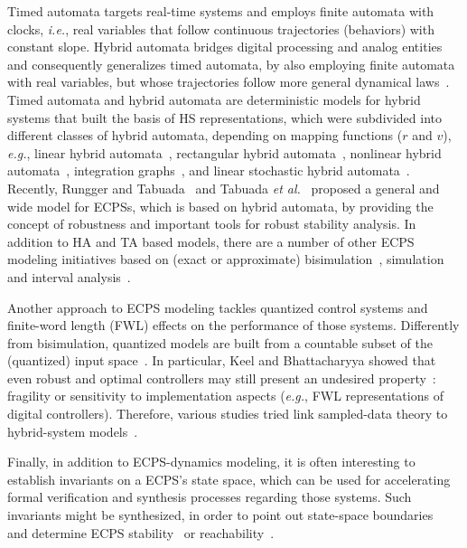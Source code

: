 \documentclass[format=acmsmall, review=false, screen=true]{acmart}
\begin{document}
Timed automata targets real-time systems and employs finite automata with clocks, {\it i.e.}, real variables that follow continuous trajectories (behaviors) with constant slope. Hybrid automata bridges digital processing and analog entities and consequently generalizes timed automata, by also employing finite automata with real variables, but whose trajectories follow more general dynamical laws~\cite{Henzinger95}.  Timed automata and hybrid automata are deterministic models for hybrid systems that built the basis of HS representations, which were subdivided into different classes of hybrid automata, depending on mapping functions ($r$ and $v$), {\it e.g.}, linear hybrid automata~\cite{Lafferriere99}, rectangular hybrid automata~\cite{Puri94,Henzinger95}, nonlinear hybrid automata~\cite{Henzinger95NL,Broucke1997}, integration graphs~\cite{Kesten1993}, and linear stochastic hybrid automata~\cite{Julius09}. Recently, Rungger and Tabuada~\cite{Rungger16} and Tabuada {\it et al.}~\cite{Tabuada14} proposed a general and wide model for ECPSs, which is based on hybrid automata, by providing the concept of robustness and important tools for robust stability analysis. In addition to HA and TA based models, there are a number of other ECPS modeling initiatives based on (exact or approximate) bisimulation~\cite{Girard11}, simulation~\cite{Rungger13} and interval analysis~\cite{Li16}.



Another approach to ECPS modeling tackles quantized control systems and finite-word length (FWL) effects on the performance of those systems. Differently from bisimulation, quantized models are built from a countable subset of the (quantized) input space~\cite{Tabuada07}. In particular, Keel and Bhattacharyya showed that even robust and optimal controllers may still present an undesired property~\cite{Keel01,bhattacharyya}: fragility or sensitivity to implementation aspects ({\it e.g.}, FWL representations of digital controllers). Therefore, various studies tried link sampled-data theory to hybrid-system models~\cite{Bicchi02,Petreczky10,Petreczky07,Ye98}.

Finally, in addition to ECPS-dynamics modeling, it is often interesting to establish invariants on a ECPS's state space, which can be used for accelerating formal verification and synthesis processes regarding those systems. Such invariants might be synthesized, in order to point out state-space boundaries~\cite{BenSassi12} and determine ECPS stability~\cite{Paul14} or reachability~\cite{Li16_2,Li16}.
\end{document}
